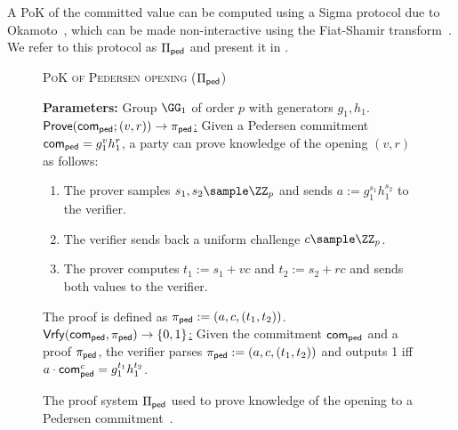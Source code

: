 A PoK of the committed value can be computed using a Sigma protocol due to Okamoto~\cite{C:Okamoto92}, which can be made non-interactive using the Fiat-Shamir transform~\cite{C:FiaSha86}. We refer to this protocol as $\Pi_{\sf ped}$ and present it in .

\begin{figure*}[tbh]
   \centering
   \begin{mdframed}
   \begin{center}
       \textsc{PoK of Pedersen opening ($\Pi_{\sf ped}$)}
   \end{center}
   \medskip
   \textbf{Parameters:} Group $\GG_1$ of order $p$ with generators $g_1, h_1$.
   \hfill\medskip\\
   \underline{$\mathsf{Prove}(\mathsf{com}_{\sf ped}; (v, r)) \to \pi_{\sf ped}$:} Given a Pedersen commitment $\mathsf{com}_{\sf ped} = g_1^v h_1^r$, a party can prove knowledge of the opening $(v,r)$ as follows:
   \begin{enumerate}
       \item The prover samples $s_1, s_2 \sample \ZZ_p$ and sends $a := g_1^{s_1} h_1^{s_2}$ to the verifier.
       \item The verifier sends back a uniform challenge $c \sample \ZZ_p$.
       \item The prover computes $t_1 := s_1 + vc$ and $t_2 := s_2 + rc$ and sends both values to the verifier.
   \end{enumerate}
   The proof is defined as $\pi_{\sf ped} := (a, c, (t_1, t_2))$.\medskip\\
   \underline{$\mathsf{Vrfy}(\mathsf{com}_{\sf ped}, \pi_{\sf ped}) \to \{0,1\}$:} Given the commitment $\mathsf{com}_{\sf ped}$ and a proof $\pi_{\sf ped}$, the verifier parses $\pi_{\sf ped} := (a, c, (t_1, t_2))$ and outputs 1 iff $a \cdot \mathsf{com}_{\sf ped}^c = g_1^{t_1} h_1^{t_2}$.
   \end{mdframed}
   \caption{The proof system $\Pi_{\sf ped}$ used to prove knowledge of the opening to a Pedersen commitment~\cite{C:Okamoto92}.}
   \label{fig:pi_ped}
\end{figure*}